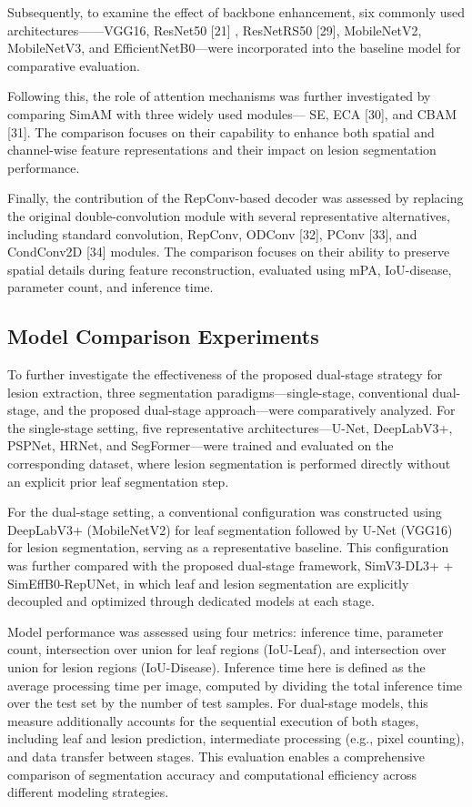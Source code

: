 \documentclass[
]{article}
\begin{document}
Subsequently, to examine the effect of backbone enhancement, six
commonly used architectures------VGG16, ResNet50 {[}21{]} , ResNetRS50
{[}29{]}, MobileNetV2, MobileNetV3, and EfficientNetB0---were
incorporated into the baseline model for comparative evaluation.

Following this, the role of attention mechanisms was further
investigated by comparing SimAM with three widely used modules--- SE,
ECA {[}30{]}, and CBAM {[}31{]}. The comparison focuses on their
capability to enhance both spatial and channel-wise feature
representations and their impact on lesion segmentation performance.

Finally, the contribution of the RepConv-based decoder was assessed by
replacing the original double-convolution module with several
representative alternatives, including standard convolution, RepConv,
ODConv {[}32{]}, PConv {[}33{]}, and CondConv2D {[}34{]} modules. The
comparison focuses on their ability to preserve spatial details during
feature reconstruction, evaluated using mPA, IoU-disease, parameter
count, and inference time.

\hypertarget{model-comparison-experiments}{%
\subsection{Model Comparison
Experiments}\label{model-comparison-experiments}}

To further investigate the effectiveness of the proposed dual-stage
strategy for lesion extraction, three segmentation
paradigms---single-stage, conventional dual-stage, and the proposed
dual-stage approach---were comparatively analyzed. For the single-stage
setting, five representative architectures---U-Net, DeepLabV3+, PSPNet,
HRNet, and SegFormer---were trained and evaluated on the corresponding
dataset, where lesion segmentation is performed directly without an
explicit prior leaf segmentation step.

For the dual-stage setting, a conventional configuration was constructed
using DeepLabV3+ (MobileNetV2) for leaf segmentation followed by U-Net
(VGG16) for lesion segmentation, serving as a representative baseline.
This configuration was further compared with the proposed dual-stage
framework, SimV3-DL3+ + SimEffB0-RepUNet, in which leaf and lesion
segmentation are explicitly decoupled and optimized through dedicated
models at each stage.

Model performance was assessed using four metrics: inference time,
parameter count, intersection over union for leaf regions (IoU-Leaf),
and intersection over union for lesion regions (IoU-Disease). Inference
time here is defined as the average processing time per image, computed
by dividing the total inference time over the test set by the number of
test samples. For dual-stage models, this measure additionally accounts
for the sequential execution of both stages, including leaf and lesion
prediction, intermediate processing (e.g., pixel counting), and data
transfer between stages. This evaluation enables a comprehensive
comparison of segmentation accuracy and computational efficiency across
different modeling strategies.
\end{document}
